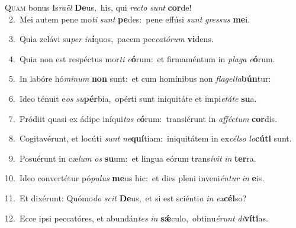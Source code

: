 \lettrine{\initial\textcolor{\initialcolor}{Q}}{uam} bonus Is\-\textit{ra}\-\textit{ël} \textbf{De}\-us,~\star his, qui \textit{rec}\-\textit{to} \textit{sunt} \textbf{cor}\-de!\\
{\numbfont\textcolor{\numbcolor}{~2.}}~Mei autem pene mo\textit{ti} \textit{sunt} \textbf{pe}\-des:~\star pene effúsi \textit{sunt} \textit{gres}\-\textit{sus} \textbf{me}\-i.\par
{\numbfont\textcolor{\numbcolor}{~3.}}~Quia zelávi su\textit{per} \textit{in}\-\textbf{í}quos,~\star pacem pec\-\textit{ca}\-\textit{tó}\textit{rum} \textbf{vi}\-dens.\par
{\numbfont\textcolor{\numbcolor}{~4.}}~Quia non est respéctus mor\textit{ti} \textit{e}\-\textbf{ó}rum:~\star et firmaméntum in \textit{pla}\-\textit{ga} \textit{e}\-\textbf{ó}rum.\par
{\numbfont\textcolor{\numbcolor}{~5.}}~In labóre hó\-\textit{mi}\-\textit{num} \textbf{non} sunt:~\star et cum homínibus non \textit{fla}\-\textit{gel}\textit{la}\textbf{bún}tur:\par
{\numbfont\textcolor{\numbcolor}{~6.}}~Ideo ténuit e\textit{os} \textit{su}\-\textbf{pér}bia,~\star opérti sunt iniquitáte et impi\-\textit{e}\-\textit{tá}\textit{te} \textbf{su}\-a.\par
{\numbfont\textcolor{\numbcolor}{~7.}}~Pródiit quasi ex ádipe iníqui\textit{tas} \textit{e}\-\textbf{ó}rum:~\star transiérunt in \textit{af}\-\textit{féc}\textit{tum} \textbf{cor}\-dis.\par
{\numbfont\textcolor{\numbcolor}{~8.}}~Cogitavérunt, et locúti \textit{sunt} \textit{ne}\-\textbf{quí}tiam:~\star iniquitátem in ex\-\textit{cél}\-\textit{so} \textit{lo}\-\textbf{cú}\textbf{ti} sunt.\par
{\numbfont\textcolor{\numbcolor}{~9.}}~Posuérunt in cæ\textit{lum} \textit{os} \textbf{su}\-um:~\star et lingua eórum trans\-\textit{í}\-\textit{vit} \textit{in} \textbf{ter}\-ra.\par
{\numbfont\textcolor{\numbcolor}{10.}}~Ideo convertétur pó\-\textit{pu}\-\textit{lus} \textbf{me}\-us hic:~\star et dies pleni inveni\-\textit{én}\-\textit{tur} \textit{in} \textbf{e}\-is.\par
{\numbfont\textcolor{\numbcolor}{11.}}~Et dixérunt: Quómo\textit{do} \textit{scit} \textbf{De}\-us,~\star et si est sciénti\textit{a} \textit{in} \textit{ex}\-\textbf{cél}so?\par
{\numbfont\textcolor{\numbcolor}{12.}}~Ecce ipsi peccatóres, et abundán\textit{tes} \textit{in} \textbf{sǽ}\-culo,~\star obtinu\-\textit{é}\-\textit{runt} \textit{di}\-\textbf{ví}\textbf{ti}as.\par
